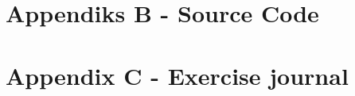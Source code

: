 \documentclass[12pt,oneside,a4paper]{article}
\begin{document}
\newpage
{}
\section{Appendiks B - Source Code} \label{ch11}
 























\newpage
\section{Appendix C - Exercise journal} \label{ch12}





\label{endOfDoc}
\end{document}
